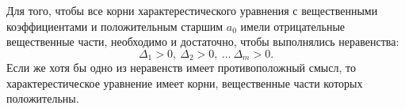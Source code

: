 \begin{to_thr}
	Для того, чтобы все корни характерестического уравнения с вещественными коэффициентами и положительным старшим $a_0$ имели отрицательные вещественные части, необходимо и достаточно, чтобы выполнялись неравенства:
	\begin{equation}
		\Delta_1 >0,
		\
		\Delta_2 > 0,
		\ \ldots \ 
		\Delta_m >0.
	\end{equation}
	Если же хотя бы одно из неравенств имеет противоположный смысл, то характерестическое уравнение имеет корни, вещественные части которых положительны.
\end{to_thr}